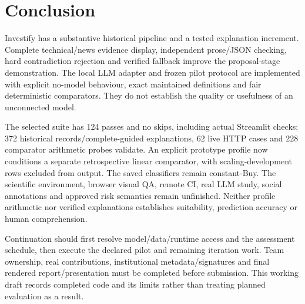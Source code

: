 \chapter{Conclusion}
Investify has a substantive historical pipeline and a tested explanation increment. Complete technical/news evidence display, independent prose/JSON checking, hard contradiction rejection and verified fallback improve the proposal-stage demonstration. The local LLM adapter and frozen pilot protocol are implemented with explicit no-model behaviour, exact maintained definitions and fair deterministic comparators. They do not establish the quality or usefulness of an unconnected model.

The selected suite has 124 passes and no skips, including actual Streamlit checks; 372 historical records/complete-guided explanations, 62 live HTTP cases and 228 comparator arithmetic probes validate. An explicit prototype profile now conditions a separate retrospective linear comparator, with scaling-development rows excluded from output. The saved classifiers remain constant-Buy. The scientific environment, browser visual QA, remote CI, real LLM study, social annotations and approved risk semantics remain unfinished. Neither profile arithmetic nor verified explanations establishes suitability, prediction accuracy or human comprehension.

Continuation should first resolve model/data/runtime access and the assessment schedule, then execute the declared pilot and remaining iteration work. Team ownership, real contributions, institutional metadata/signatures and final rendered report/presentation must be completed before submission. This working draft records completed code and its limits rather than treating planned evaluation as a result.
